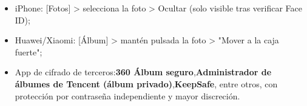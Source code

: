 \begin{itemize}
  \item iPhone: [Fotos] > selecciona la foto > Ocultar (solo visible tras verificar Face ID);
  \item Huawei/Xiaomi: [Álbum] > mantén pulsada la foto > "Mover a la caja fuerte";
  \item App de cifrado de terceros:\textbf{360 Álbum seguro},\textbf{Administrador de álbumes de Tencent (álbum privado)},\textbf{KeepSafe}, entre otros, con protección por contraseña independiente y mayor discreción.
\end{itemize}
